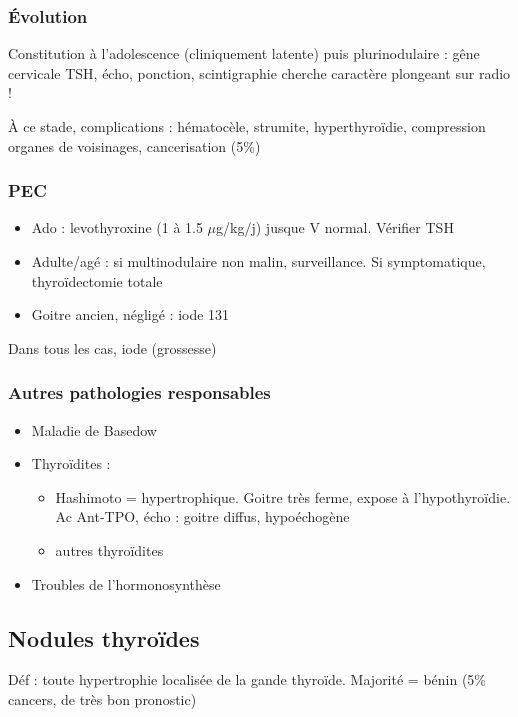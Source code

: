 \documentclass{book}
\begin{document}
\subsubsection{Évolution}
\label{sec:org0d8ffb3}
Constitution à l'adolescence (cliniquement latente) puis plurinodulaire : gêne
cervicale \thus TSH, écho, ponction, scintigraphie
\danger cherche caractère plongeant sur radio !

À ce stade, complications : hématocèle, strumite, hyperthyroïdie, compression
organes de voisinages, cancerisation (5\%)

\subsubsection{PEC}
\label{sec:orgeb92128}
\begin{itemize}
\item Ado : levothyroxine (1 à 1.5 \(\mu\)g/kg/j) jusque V normal. Vérifier TSH
\item Adulte/agé : si multinodulaire non malin, surveillance. Si symptomatique,
thyroïdectomie totale
\item Goitre ancien, négligé : iode 131
\end{itemize}
Dans tous les cas, \inc iode (grossesse)

\subsubsection{Autres pathologies responsables}
\label{sec:orgdf06107}
\begin{itemize}
\item Maladie de Basedow
\item Thyroïdites : 
\begin{itemize}
\item Hashimoto = hypertrophique. Goitre très ferme, expose à l'hypothyroïdie. Ac Ant-TPO\inc\inc{}, écho : goitre diffus, hypoéchogène
\item autres thyroïdites
\end{itemize}
\item Troubles de l'hormonosynthèse
\end{itemize}

\subsection{Nodules thyroïdes}
\label{sec:org011ae43}
Déf : toute hypertrophie localisée de la gande thyroïde. Majorité = bénin (5\%
cancers, de très bon pronostic)
\end{document}
